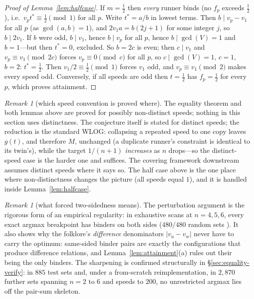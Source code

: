\documentclass[11pt,a4paper]{article}
\numberwithin{equation}{section}
\theoremstyle{plain}
\theoremstyle{definition}
\theoremstyle{remark}
\newtheorem{remark}[theorem]{Remark}
\begin{document}
\begin{proof}[Proof of Lemma~\ref{lem:halfcase}]
If $m=\tfrac12$ then \emph{every} runner binds (no $f_p$ exceeds
$\tfrac12$), i.e.\ $v_p t^\ast\equiv \tfrac12 \pmod 1$ for all $p$. Write
$t^\ast=a/b$ in lowest terms. Then $b\mid v_p-v_1$ for all $p$ (as
$\gcd(a,b)=1$), and $2v_1 a=b(2j+1)$ for some integer $j$, so $b\mid
2v_1$. If $b$ were odd, $b\mid v_1$, hence $b\mid v_p$ for all $p$, hence
$b\mid\gcd(V)=1$ and $b=1$---but then $t^\ast=0$, excluded. So $b=2c$ is
even; then $c\mid v_1$ and $v_p\equiv v_1\pmod{2c}$ forces
$v_p\equiv 0\pmod c$ for all $p$, so $c\mid\gcd(V)=1$, $c=1$, $b=2$:
$t^\ast=\tfrac12$. Then $v_1/2\equiv\tfrac12\pmod 1$ forces $v_1$ odd,
and $v_p\equiv v_1\pmod 2$ makes every speed odd. Conversely, if all
speeds are odd then $t=\tfrac12$ has $f_p=\tfrac12$ for every $p$,
which proves attainment.
\end{proof}

\begin{remark}[which speed convention is proved where]
The equality theorem and both lemmas above are proved for possibly
non-distinct speeds; nothing in this section uses distinctness. The
conjecture itself is stated for distinct speeds; the reduction is the
standard WLOG: collapsing a repeated speed to one copy leaves $g(t)$,
and therefore $M$, unchanged (a duplicate runner's constraint is
identical to its twin's), while the target $1/(n{+}1)$ \emph{increases}
as $n$ drops---so the distinct-speed case is the harder one and suffices.
The covering framework downstream assumes distinct speeds where it says
so. The half case above is the one place where non-distinctness changes
the picture (all speeds equal $1$), and it is handled inside
Lemma~\ref{lem:halfcase}.
\end{remark}

\begin{remark}[what forced two-sidedness means]\label{rem:twosided}
The perturbation argument is the rigorous form of an empirical
regularity: in exhaustive scans at $n=4,5,6$, every exact argmax
breakpoint has binders on both sides ($480/480$ random sets
\cite{prog-artifacts}). It also shows why the folklore's
\emph{difference} denominators $|v_u-v_w|$ never have to carry the
optimum: same-sided binder pairs are exactly the configurations that
produce difference relations, and Lemma~\ref{lem:attainment}(a) rules out
their being the only binders. The sharpening is confirmed structurally in
\S\ref{sec:equality-verify}: in $885$ test sets and, under a from-scratch
reimplementation, in $2{,}870$ further sets spanning $n=2$ to $6$ and
speeds to $200$, no unrestricted argmax lies off the pair-sum skeleton.
\end{remark}
\end{document}
